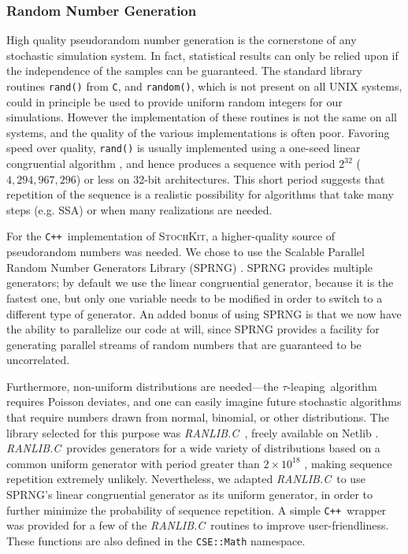 \documentclass[12pt]{article}
\newcommand{\tauleaping}{$\tau$-leap\-ing}
\newcommand{\matlab}{\textsc{Matlab}}
\newcommand{\cpp}{\texttt{C++}}%
\newcommand{\clang}{\texttt{C}}%
\newcommand{\api}[1]{\texttt{#1}}
\newcommand{\srccode}[1]{\texttt{#1}}
\newcommand{\ranlib}{\emph{RANLIB.C}}
\newcommand{\sspack}{\textsc{StochKit}}
\begin{document}
\subsubsection{Random Number Generation}
High quality pseudorandom number generation is the cornerstone of any
stochastic simulation system.  In fact, statistical results can only
be relied upon if the independence of the samples can be guaranteed.
The standard library routines \api{rand()} from \clang, and
\api{random()}, which is not present on all UNIX systems, could in
principle be used to provide uniform random integers for our simulations.
However the implementation of these routines is not the same on all
systems, and the quality of the various implementations is often poor.
Favoring speed over quality, \api{rand()} is usually implemented using
a one-seed linear congruential algorithm \cite{numericalrecipes}, and
hence produces a sequence with period $2^{32}$ ($4,294,967,296$) or
less on 32-bit architectures.  This short period suggests that
repetition of the sequence is a realistic possibility for algorithms
that take many steps (e.g. SSA) or when many realizations are needed.

For the \cpp\ implementation of \sspack, a
higher-quality source of pseudorandom numbers was needed.
We chose to use the Scalable Parallel Random Number Generators Library
(SPRNG) \cite{mascagni-99, mascagni-srinivasan-00}. SPRNG provides
multiple generators; by default we use the linear congruential
generator, because it is the fastest one, but only one variable needs
to be modified in order to switch to a different type of generator.
An added bonus of using SPRNG is that we now have the ability to
parallelize our code at will, since SPRNG provides a facility for
generating parallel streams of random numbers that are guaranteed to
be uncorrelated.

Furthermore, non-uniform distributions are needed---the \tauleaping\
algorithm requires Poisson deviates, and one can easily imagine
future stochastic algorithms that require numbers drawn from normal,
binomial, or other distributions.  The library selected for this
purpose was \ranlib\ \cite{ranlib}, freely available on Netlib
\cite{netlib}.  \ranlib\ provides generators for a wide variety of
distributions based on a common uniform generator with period greater
than $2 \times 10^{18}$ \cite{lecuyer-cote-91}, making sequence
repetition extremely unlikely.  Nevertheless, we adapted \ranlib\ to
use SPRNG's linear congruential generator as its uniform generator,
in order to further minimize the
probability of sequence repetition. A simple \cpp\ wrapper was provided
for a few of the \ranlib\ routines to improve user-friendliness.
These functions are also defined in the \srccode{CSE::Math} namespace.
\end{document}
